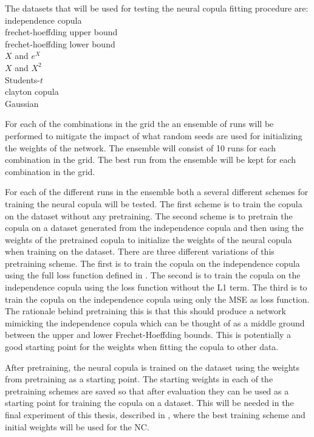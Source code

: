 The datasets that will be used for testing the neural copula fitting procedure are:\\ 
independence copula\\
frechet-hoeffding upper bound\\
frechet-hoeffding lower bound\\
$X$ and $e^X$ \\
$X$ and $X^2$\\
Students-$t$ \\
clayton copula\\
Gaussian



For each of the combinations in the grid the an ensemble of runs will be performed to mitigate the impact of what random seeds are used for initializing the weights of the network. The ensemble will consist of 10 runs for each combination in the grid. The best run from the ensemble will be kept for each combination in the grid. 

For each of the different runs in the ensemble both a several different schemes for training the neural copula will be tested. The first scheme is to train the copula on the dataset without any pretraining. The second scheme is to pretrain the copula on a dataset generated from the independence copula and then using the weights of the pretrained copula to initialize the weights of the neural copula when training on the dataset. There are three different variations of this pretraining scheme. The first is to train the copula on the independence copula using the full loss function defined in . The second is to train the copula on the independence copula using the loss function without the L1 term. The third is to train the copula on the independence copula using only the MSE as loss function. The rationale behind pretraining this is that this should produce a network mimicking the independence copula which can be thought of as a middle ground between the upper and lower Frechet-Hoeffding bounds. This is potentially a good starting point for the weights when fitting the copula to other data.  

After pretraining, the neural copula is trained on the dataset using the weights from pretraining as a starting point. The starting weights in each of the pretraining schemes are saved so that after evaluation they can be used as a starting point for training the copula on a dataset. This will be needed in the final experiment of this thesis, described in , where the best training scheme and initial weights will be used for the \gls{NC}. 

